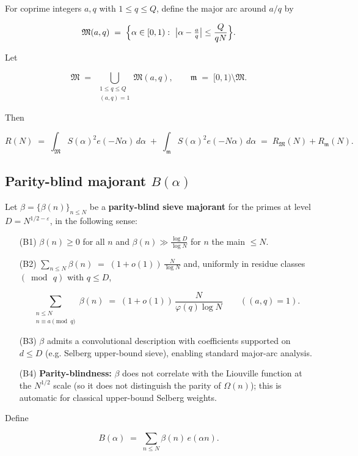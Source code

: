 \documentclass[11pt]{article}
\theoremstyle{definition}
\theoremstyle{remark}
\numberwithin{equation}{part}
\begin{document}
For coprime integers $a,q$ with $1\le q\le Q$, define the major arc around $a/q$ by

$$
	\mathfrak M(a,q)\;=\;\Bigl\{\alpha\in[0,1):\ \bigl|\alpha-\tfrac{a}{q}\bigr|
	\le \frac{Q}{qN}\Bigr\}.
$$

Let

$$
	\mathfrak M\;=\;\bigcup_{\substack{1\le q\le Q\\ (a,q)=1}}\mathfrak M(a,q),
	\qquad
	\mathfrak m\;=\;[0,1)\setminus\mathfrak M .
$$

Then

$$
	R(N)\;=\;\int_{\mathfrak M} S(\alpha)^2 e(-N\alpha)\,d\alpha\;+\;
	\int_{\mathfrak m} S(\alpha)^2 e(-N\alpha)\,d\alpha
	\;=\;R_{\mathfrak M}(N)+R_{\mathfrak m}(N).
$$


\subsection{Parity-blind majorant \texorpdfstring{$B(\alpha)$}{B\textalpha}}

Let $\beta=\{\beta(n)\}_{n\le N}$ be a \textbf{parity-blind sieve majorant} for the primes at level $D=N^{1/2-\varepsilon}$, in the following sense:

\begin{itemize}[leftmargin=*]
	\item[(B1)] $\beta(n)\ge 0$ for all $n$ and $\beta(n)\gg \tfrac{\log D}{\log N}$ for $n$ the main $\le N$.
	\item[(B2)] $\displaystyle \sum_{n\le N}\beta(n)\;=\;(1+o(1))\,\frac{N}{\log N}$ and, uniformly in residue classes $(\bmod\,q)$ with $q\le D$,

	      $$
		      \sum_{\substack{n\le N\\ n\equiv a\!\!\!\pmod q}}\beta(n)
		      \;=\;(1+o(1))\,\frac{N}{\varphi(q)\log N}\qquad ((a,q)=1).
	      $$

	\item[(B3)] $\beta$ admits a convolutional description with coefficients supported on $d\le D$ (e.g. Selberg upper-bound sieve), enabling standard major-arc analysis.
	\item[(B4)] \textbf{Parity-blindness:} $\beta$ does not correlate with the Liouville function at the $N^{1/2}$ scale (so it does not distinguish the parity of $\Omega(n)$); this is automatic for classical upper-bound Selberg weights.
\end{itemize}

Define

$$
	B(\alpha)\;=\;\sum_{n\le N}\beta(n)\,e(\alpha n).
$$
\end{document}

